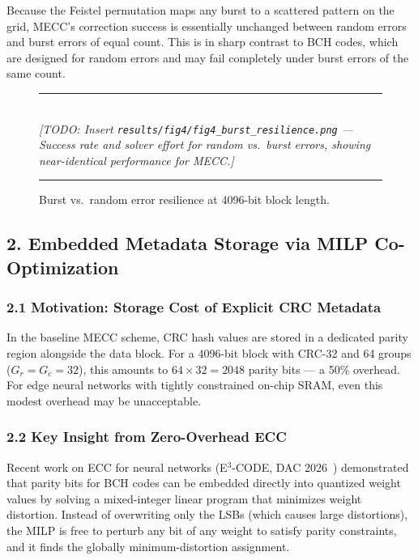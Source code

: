 Because the Feistel permutation maps any burst to a scattered pattern on the grid, MECC's correction success is essentially unchanged between random errors and burst errors of equal count.
This is in sharp contrast to BCH codes, which are designed for random errors and may fail completely under burst errors of the same count.

\begin{figure}[h]
\centering
\rule{0.85\textwidth}{0.4pt}\\[6pt]
\textit{[TODO: Insert \texttt{results/fig4/fig4\_burst\_resilience.png} --- Success rate and solver effort for random vs.\ burst errors, showing near-identical performance for MECC.]}\\[6pt]
\rule{0.85\textwidth}{0.4pt}
\caption{Burst vs.\ random error resilience at 4096-bit block length.}
\label{fig:burst}
\end{figure}

\subsection*{2. Embedded Metadata Storage via MILP Co-Optimization}

\subsubsection*{2.1 Motivation: Storage Cost of Explicit CRC Metadata}

In the baseline MECC scheme, CRC hash values are stored in a dedicated parity region alongside the data block.
For a 4096-bit block with CRC-32 and 64 groups ($G_r = G_c = 32$), this amounts to $64 \times 32 = 2048$ parity bits --- a 50\% overhead.
For edge neural networks with tightly constrained on-chip SRAM, even this modest overhead may be unacceptable.

\subsubsection*{2.2 Key Insight from Zero-Overhead ECC}

Recent work on ECC for neural networks (E$^3$-CODE, DAC 2026~\cite{e3code2026}) demonstrated that parity bits for BCH codes can be embedded directly into quantized weight values by solving a mixed-integer linear program that minimizes weight distortion.
Instead of overwriting only the LSBs (which causes large distortions), the MILP is free to perturb any bit of any weight to satisfy parity constraints, and it finds the globally minimum-distortion assignment.

